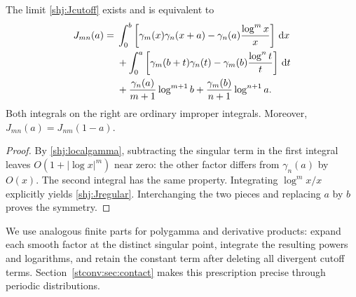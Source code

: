 \begin{lemma}\label{shj:Jexists}
The limit \eqref{shj:Jcutoff} exists and is equivalent to
\begin{align}
J_{mn}(a)={}&\int_0^b\left[
\gamma_m(x)\gamma_n(x+a)-\gamma_n(a)\frac{\log^m x}{x}\right]\,\mathrm d x\notag\\
&+\int_0^a\left[
\gamma_m(b+t)\gamma_n(t)-\gamma_m(b)\frac{\log^n t}{t}\right]\,\mathrm d t\notag\\
&+\frac{\gamma_n(a)}{m+1}\log^{m+1}b
+\frac{\gamma_m(b)}{n+1}\log^{n+1}a.
\label{shj:Jregular}
\end{align}
Both integrals on the right are ordinary improper integrals. Moreover,
$J_{mn}(a)=J_{nm}(1-a)$.
\end{lemma}
\begin{proof}
By \eqref{shj:localgamma}, subtracting the singular term in the first integral leaves $O(1+|\log x|^m)$ near zero: the other factor differs from $\gamma_n(a)$ by $O(x)$. The second integral has the same property. Integrating $\log^m x/x$ explicitly yields \eqref{shj:Jregular}. Interchanging the two pieces and replacing $a$ by $b$ proves the symmetry.
\end{proof}
We use analogous finite parts for polygamma and derivative products: expand each smooth factor at the distinct singular point, integrate the resulting powers and logarithms, and retain the constant term after deleting all divergent cutoff terms. Section~\ref{stconv:sec:contact} makes this prescription precise through periodic distributions.

